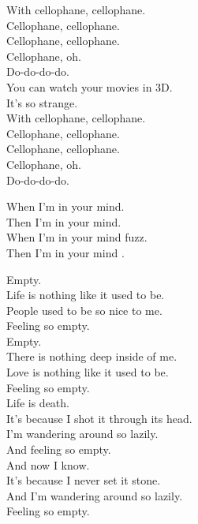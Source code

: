 With cellophane, cellophane. \\
Cellophane, cellophane. \\
Cellophane, cellophane. \\
Cellophane, oh. \\
Do-do-do-do. \\

You can watch your movies in 3D. \\
It's so strange. \\

With cellophane, cellophane. \\
Cellophane, cellophane. \\
Cellophane, cellophane. \\
Cellophane, oh. \\
Do-do-do-do. \\




When I'm in your mind. \\
Then I'm in your mind. \\
When I'm in your mind fuzz. \\
Then I'm in your mind . \\




Empty. \\
Life is nothing like it used to be. \\
People used to be so nice to me. \\
Feeling so empty. \\
Empty. \\
There is nothing deep inside of me. \\
Love is nothing like it used to be. \\
Feeling so empty. \\

Life is death. \\
It's because I shot it through its head. \\
I'm wandering around so lazily. \\
And feeling so empty. \\
And now I know. \\
It's because I never set it stone. \\
And I'm wandering around so lazily. \\
Feeling so empty. \\

